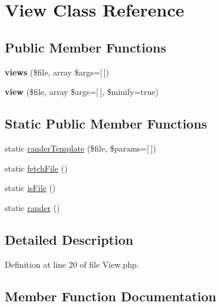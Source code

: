 \hypertarget{class_zest_1_1_view_1_1_view}{}\section{View Class Reference}
\label{class_zest_1_1_view_1_1_view}
\subsection*{Public Member Functions}
\begin{DoxyCompactItemize}
\item 
\mbox{\label{class_zest_1_1_view_1_1_view_aefea84ad6c050b39e61048de2cf5225f}} 
{\bfseries views} (\$file, array \$args=\mbox{[}$\,$\mbox{]})
\item 
\mbox{\label{class_zest_1_1_view_1_1_view_a66e8502d494ecce6ade4f35e65e4c76e}} 
{\bfseries view} (\$file, array \$args=\mbox{[}$\,$\mbox{]}, \$minify=true)
\end{DoxyCompactItemize}
\subsection*{Static Public Member Functions}
\begin{DoxyCompactItemize}
\item 
static \mbox{\hyperlink{class_zest_1_1_view_1_1_view_a9f3e0779913ae33f6f67726498e37815}{rander\+Template}} (\$file, \$params=\mbox{[}$\,$\mbox{]})
\item 
static \mbox{\hyperlink{class_zest_1_1_view_1_1_view_a44206629591bb658ad32d1f86c023526}{fetch\+File}} ()
\item 
static \mbox{\hyperlink{class_zest_1_1_view_1_1_view_a5114b9fecb007e9aa08c1d1669ecccac}{is\+File}} ()
\item 
static \mbox{\hyperlink{class_zest_1_1_view_1_1_view_a169b39f53b8d8e35bd0c099da257322e}{rander}} ()
\end{DoxyCompactItemize}


\subsection{Detailed Description}


Definition at line 20 of file View.\+php.



\subsection{Member Function Documentation}
\mbox{\label{class_zest_1_1_view_1_1_view_a44206629591bb658ad32d1f86c023526}} 
